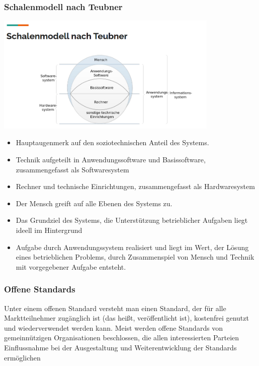 \subsubsection{Schalenmodell nach Teubner}
\includegraphics[width=0.8\textwidth]{assets/SchalenmodellTeubner.PNG}
\begin{itemize}
  \item Hauptaugenmerk auf den soziotechnischen Anteil des Systems.
  \item Technik aufgeteilt in Anwendungssoftware und Basissoftware, zusammengefasst als Softwaresystem
  \item Rechner und technische Einrichtungen, zusammengefasst als Hardwaresystem
  \item Der Mensch greift auf alle Ebenen des Systems zu.
  \item Das Grundziel des Systems, die Unterstützung betrieblicher Aufgaben liegt ideell im Hintergrund
  \item Aufgabe durch Anwendungssystem realisiert und liegt im Wert, der Lösung eines betrieblichen Problems, durch Zusammenspiel von Mensch und Technik mit vorgegebener Aufgabe entsteht.
\end{itemize}


\subsubsection{Offene Standards}
Unter einem offenen Standard versteht man einen Standard, der für alle Marktteilnehmer zugänglich ist (das heißt, veröffentlicht ist), kostenfrei genutzt und wiederverwendet werden kann. Meist werden offene Standards von gemeinnützigen Organisationen beschlossen, die allen interessierten Parteien Einflussnahme bei der Ausgestaltung und Weiterentwicklung der Standards ermöglichen

